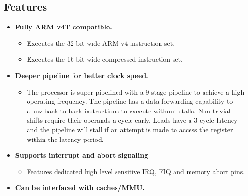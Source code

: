 \documentclass[11pt]{article}
\begin{document}

\subsection{Features}

\begin{itemize}

\item \textbf{Fully ARM v4T compatible.}

        \begin{itemize}

        \item Executes the 32-bit wide ARM v4 instruction set.

        \item Executes the 16-bit wide compressed instruction set.

        \end{itemize}

\item \textbf{Deeper pipeline for better clock speed.}

        \begin{itemize}

        \item The processor is super-pipelined with a 9 stage pipeline to 
        achieve a high operating frequency. The pipeline has a data forwarding 
        capability to allow back to back instructions to execute without 
        stalls. Non trivial shifts require their operands a cycle early. Loads 
        have a 3 cycle latency and the pipeline will stall if an attempt is 
        made to access the register within the latency period.

        \end{itemize}

\item{\textbf{Supports interrupt and abort signaling}}

        \begin{itemize}

        \item Features dedicated high level sensitive IRQ, FIQ and memory abort 
        pins.

        \end{itemize}

\item \textbf{Can be interfaced with caches/MMU.}

        \begin{itemize}


\end{itemize}
\end{itemize}
\end{document}
